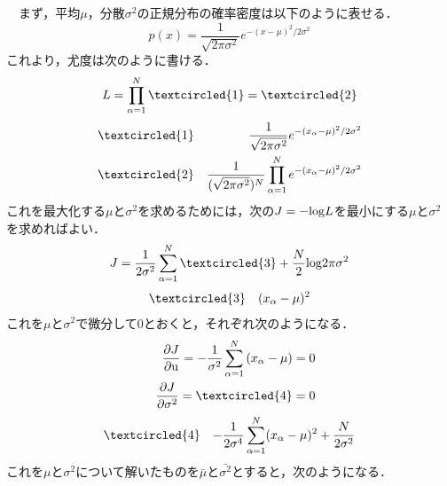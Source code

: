 \documentclass[a4paper,11pt]{jarticle}
\begin{document}
\begin{enumerate}
\ \ まず，平均$ \mu $，分散$ \sigma^2 $の正規分布の確率密度は以下のように表せる．
\begin{equation}
 p(x) = \dfrac{1}{\sqrt{2 \pi \sigma^2}} e^{-(x - \mu)^2 / 2 \sigma^2}
\end{equation}
これより，尤度は次のように書ける．
\begin{equation}
 L = \prod^N_{\alpha = 1} \textcircled{\scriptsize 1} = \textcircled{\scriptsize 2}
\end{equation}
\begin{eqnarray*}
 & \textcircled{\scriptsize 1} & \dfrac{1}{\sqrt{2\pi\sigma^2}}e^{-(x_{\alpha}-\mu)^2/2\sigma^2} \\
 & \textcircled{\scriptsize 2} & \dfrac{1}{(\sqrt{2\pi\sigma^2})^N} \prod^N_{\alpha = 1} e^{-(x_{\alpha}-\mu)^2/2\sigma^2}
\end{eqnarray*}
これを最大化する$ \mu $と$ \sigma^2 $を求めるためには，次の$ J = - {\rm log} L $を最小にする$ \mu $と$ \sigma^2 $を求めればよい．
\begin{equation}
 J = \dfrac{1}{2 \sigma^2} \sum^N_{\alpha = 1} \textcircled{\scriptsize 3} + \dfrac{N}{2} {\rm log} 2 \pi \sigma^2
\end{equation}
\begin{eqnarray*}
 & \textcircled{\scriptsize 3} & (x_{\alpha}-\mu)^2
\end{eqnarray*}
これを$ \mu $と$ \sigma^2 $で微分して$ 0 $とおくと，それぞれ次のようになる．
\begin{eqnarray}
 && \dfrac{ \partial J}{ \partial {\rm u } } = - \dfrac{1}{\sigma^2} \sum^N_{\alpha = 1} \left( x_{\alpha} - \mu \right) = 0 \\
 && \dfrac{ \partial J}{ \partial \sigma^2 } = \textcircled{\scriptsize 4} = 0
\end{eqnarray}
\begin{eqnarray*}
 & \textcircled{\scriptsize 4} & -\dfrac{1}{2\sigma^4} \sum^N_{\alpha=1} (x_{\alpha}-\mu)^2 + \dfrac{N}{2\sigma^2}
\end{eqnarray*}
これを$ \mu $と$ \sigma^2 $について解いたものを$ \bar{\mu} $と$ \bar{\sigma^2} $とすると，次のようになる．

\end{enumerate}
\end{document}
